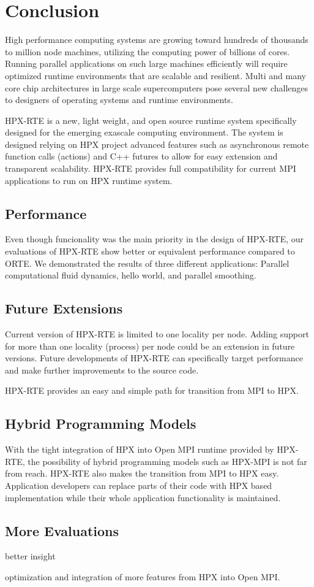 \chapter{Conclusion}
\label{sec:Conclusion}

High performance computing systems are growing toward hundreds of thousands to million node machines, utilizing the computing power of billions of cores. Running parallel applications on such large machines efficiently will require optimized runtime environments that are scalable and resilient. Multi and many core chip architectures in large scale supercomputers pose several new challenges to designers of operating systems and runtime environments.

HPX-RTE is a new, light weight, and open source runtime system specifically designed for the emerging exascale computing environment. The system is designed relying on HPX project advanced features such as asynchronous remote function calls (actions) and C++ futures to allow for easy extension and transparent scalability. HPX-RTE provides full compatibility for current MPI applications to run on HPX runtime system. 

\section{Performance}
Even though funcionality was the main priority in the design of HPX-RTE, our evaluations of HPX-RTE show better or equivalent performance compared to ORTE. We demonstrated the results of three different applications: Parallel computational fluid dynamics, hello world, and parallel smoothing.

\section{Future Extensions}
Current version of HPX-RTE is limited to one locality per node. Adding support for more than one locality (process) per node could be an extension in future versions.
Future developments of HPX-RTE can specifically target performance and make further improvements to the source code. 

HPX-RTE provides an easy and simple path for transition from MPI to HPX. 

\section{Hybrid Programming Models}
With the tight integration of HPX into Open MPI runtime provided by HPX-RTE, the possibility of hybrid programming models such as HPX-MPI is not far from reach. HPX-RTE also makes the transition from MPI to HPX easy. Application developers can replace parts of their code with HPX based implementation while their whole application functionality is maintained.

\section{More Evaluations}
better insight

optimization
and integration of more features from HPX into Open MPI.
